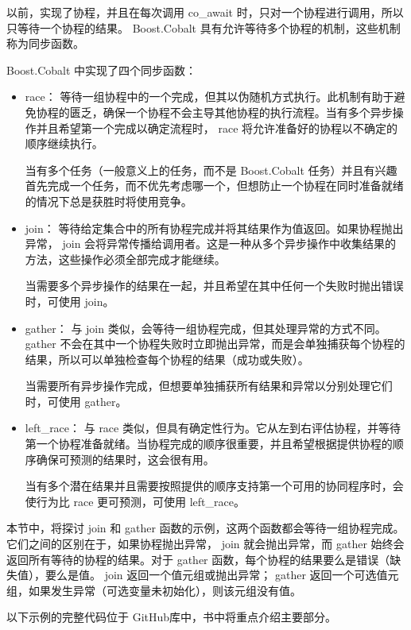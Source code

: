 以前，实现了协程，并且在每次调用 co\_await 时，只对一个协程进行调用，所以只等待一个协程的结果。 Boost.Cobalt 具有允许等待多个协程的机制，这些机制称为同步函数。

Boost.Cobalt 中实现了四个同步函数：

\begin{itemize}
\item
race： 等待一组协程中的一个完成，但其以伪随机方式执行。此机制有助于避免协程的匮乏，确保一个协程不会主导其他协程的执行流程。当有多个异步操作并且希望第一个完成以确定流程时， race 将允许准备好的协程以不确定的顺序继续执行。

当有多个任务（一般意义上的任务，而不是 Boost.Cobalt 任务）并且有兴趣首先完成一个任务，而不优先考虑哪一个，但想防止一个协程在同时准备就绪的情况下总是获胜时将使用竞争。

\item
join： 等待给定集合中的所有协程完成并将其结果作为值返回。如果协程抛出异常， join 会将异常传播给调用者。这是一种从多个异步操作中收集结果的方法，这些操作必须全部完成才能继续。

当需要多个异步操作的结果在一起，并且希望在其中任何一个失败时抛出错误时，可使用 join。

\item
gather： 与 join 类似，会等待一组协程完成，但其处理异常的方式不同。 gather 不会在其中一个协程失败时立即抛出异常，而是会单独捕获每个协程的结果，所以可以单独检查每个协程的结果（成功或失败）。

当需要所有异步操作完成，但想要单独捕获所有结果和异常以分别处理它们时，可使用 gather。

\item
left\_race： 与 race 类似，但具有确定性行为。它从左到右评估协程，并等待第一个协程准备就绪。当协程完成的顺序很重要，并且希望根据提供协程的顺序确保可预测的结果时，这会很有用。

当有多个潜在结果并且需要按照提供的顺序支持第一个可用的协同程序时，会使行为比 race 更可预测，可使用 left\_race。
\end{itemize}

本节中，将探讨 join 和 gather 函数的示例，这两个函数都会等待一组协程完成。它们之间的区别在于，如果协程抛出异常， join 就会抛出异常，而 gather 始终会返回所有等待的协程的结果。对于 gather 函数，每个协程的结果要么是错误（缺失值），要么是值。 join 返回一个值元组或抛出异常； gather 返回一个可选值元组，如果发生异常（可选变量未初始化），则该元组没有值。

以下示例的完整代码位于 GitHub库中，书中将重点介绍主要部分。

